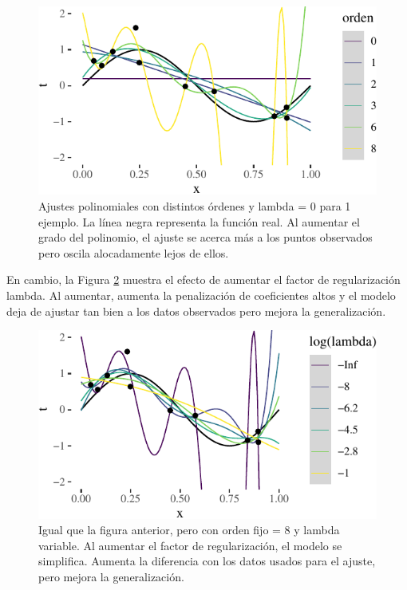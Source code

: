 \documentclass[]{tufte-handout}
\begin{document}
\begin{figure}
\includegraphics{TP-Labo-1_files/figure-latex/ajustes-orden-1} \caption[Ajustes polinomiales con distintos órdenes y lambda = 0 para 1 ejemplo]{Ajustes polinomiales con distintos órdenes y lambda = 0 para 1 ejemplo. La línea negra representa la función real. Al aumentar el grado del polinomio, el ajuste se acerca más a los puntos observados pero oscila alocadamente lejos de ellos.}\label{fig:ajustes-orden}
\end{figure}

En cambio, la Figura \ref{fig:ajustes-lambda} muestra el efecto de aumentar el factor de regularización lambda. Al aumentar, aumenta la penalización de coeficientes altos y el modelo deja de ajustar tan bien a los datos observados pero mejora la generalización.

\begin{figure}
\includegraphics{TP-Labo-1_files/figure-latex/ajustes-lambda-1} \caption[Igual que la figura anterior, pero con orden fijo = 8 y lambda variable]{Igual que la figura anterior, pero con orden fijo = 8 y lambda variable. Al aumentar el factor de regularización, el modelo se simplifica. Aumenta la diferencia con los datos usados para el ajuste, pero mejora la generalización.}\label{fig:ajustes-lambda}
\end{figure}
\end{document}
